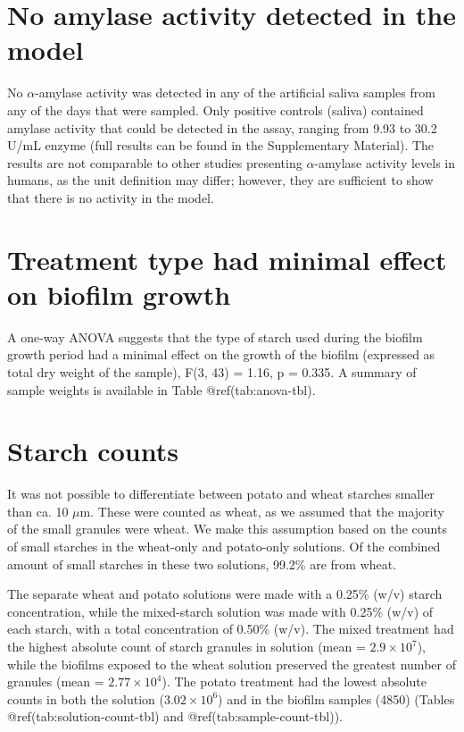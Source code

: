 \documentclass[
  letterpaper,
]{book}
\begin{document}
\hypertarget{no-amylase-activity-detected-in-the-model}{%
\section{No amylase activity detected in the
model}\label{no-amylase-activity-detected-in-the-model}}

No \(\alpha\)-amylase activity was detected in any of the artificial
saliva samples from any of the days that were sampled. Only positive
controls (saliva) contained amylase activity that could be detected in
the assay, ranging from 9.93 to 30.2 U/mL enzyme (full results can be
found in the Supplementary Material). The results are not comparable to
other studies presenting \(\alpha\)-amylase activity levels in humans,
as the unit definition may differ; however, they are sufficient to show
that there is no activity in the model.

\hypertarget{treatment-type-had-minimal-effect-on-biofilm-growth}{%
\section{Treatment type had minimal effect on biofilm
growth}\label{treatment-type-had-minimal-effect-on-biofilm-growth}}

A one-way ANOVA suggests that the type of starch used during the biofilm
growth period had a minimal effect on the growth of the biofilm
(expressed as total dry weight of the sample), F(3, 43) = 1.16, p =
0.335. A summary of sample weights is available in Table
@ref(tab:anova-tbl).

\hypertarget{starch-counts}{%
\section{Starch counts}\label{starch-counts}}

It was not possible to differentiate between potato and wheat starches
smaller than ca. 10 \(\mu\)m. These were counted as wheat, as we assumed
that the majority of the small granules were wheat. We make this
assumption based on the counts of small starches in the wheat-only and
potato-only solutions. Of the combined amount of small starches in these
two solutions, 99.2\% are from wheat.

The separate wheat and potato solutions were made with a 0.25\% (w/v)
starch concentration, while the mixed-starch solution was made with
0.25\% (w/v) of each starch, with a total concentration of 0.50\% (w/v).
The mixed treatment had the highest absolute count of starch granules in
solution (mean = \ensuremath{2.9\times 10^{7}}), while the biofilms
exposed to the wheat solution preserved the greatest number of granules
(mean = \ensuremath{2.77\times 10^{4}}). The potato treatment had the
lowest absolute counts in both the solution
(\ensuremath{3.02\times 10^{6}}) and in the biofilm samples (4850)
(Tables @ref(tab:solution-count-tbl) and @ref(tab:sample-count-tbl)).
\end{document}
